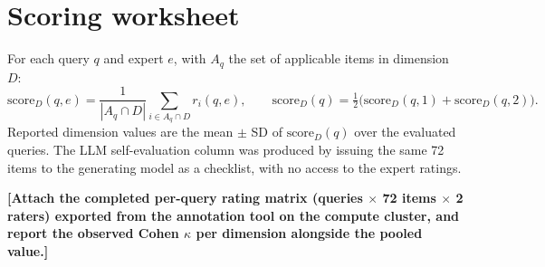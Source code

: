 \documentclass[10pt]{article}
\newcommand{\PH}[1]{{\color{red}\textbf{[#1]}}}
\begin{document}
\vspace{-6pt}

\section{Scoring worksheet}
\noindent
For each query $q$ and expert $e$, with $A_{q}$ the set of applicable items in
dimension $D$:
\[
\text{score}_{D}(q,e)=\frac{1}{|A_{q}\cap D|}\sum_{i\in A_{q}\cap D} r_{i}(q,e),
\qquad
\text{score}_{D}(q)=\tfrac{1}{2}\bigl(\text{score}_{D}(q,1)+\text{score}_{D}(q,2)\bigr).
\]
Reported dimension values are the mean $\pm$ SD of $\text{score}_{D}(q)$ over the
evaluated queries. The LLM self-evaluation column was produced by issuing the
same 72 items to the generating model as a checklist, with no access to the
expert ratings.

\vspace{6pt}
\noindent
\PH{Attach the completed per-query rating matrix (queries $\times$ 72 items
$\times$ 2 raters) exported from the annotation tool on the compute cluster, and
report the observed Cohen $\kappa$ per dimension alongside the pooled value.}
\end{document}
